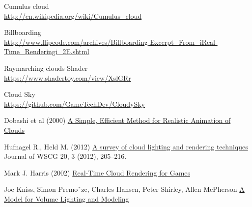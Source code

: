 Cumulus cloud \\
\underline{http://en.wikipedia.org/wiki/Cumulus\_cloud}

Billboarding \\
{\footnotesize \underline{http://www.flipcode.com/archives/Billboarding-Excerpt\_From\_iReal-Time\_Renderingi\_2E.shtml}}

Raymarching clouds Shader \\
\underline{https://www.shadertoy.com/view/XslGRr}

Cloud Sky \\
\underline{https://github.com/GameTechDev/CloudySky}

Dobashi et al (2000) \underline{A Simple, Efficient Method for Realistic Animation of Clouds}

Hufnagel R., Held M. (2012) \underline{A survey of cloud lighting and rendering techniques} Journal of WSCG 20, 3 (2012), 205–216.

Mark J. Harris (2002) \underline{Real-Time Cloud Rendering for Games}

Joe Kniss, Simon Premoˇze, Charles Hansen, Peter Shirley, Allen McPherson \underline{A Model for Volume Lighting and Modeling}